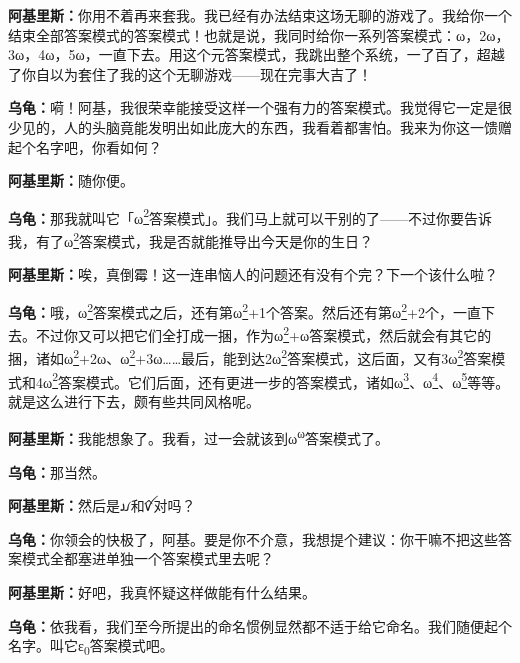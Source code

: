 \documentclass[
  12pt,
  twoside,
  openright,
  oldfontcommands,
]{memoir}
\newcommand{\dialogname}[1]{{\heifamily\bfseries #1}}
\begin{document}
\dialogname{阿基里斯：}你用不着再来套我。我已经有办法结束这场无聊的游戏了。我给你一个结束全部答案模式的答案模式！也就是说，我同时给你一系列答案模式：ω，2ω，3ω，4ω，5ω，一直下去。用这个元答案模式，我跳出整个系统，一了百了，超越了你自以为套住了我的这个无聊游戏------现在完事大吉了！

\dialogname{乌龟：}嗬！阿基，我很荣幸能接受这样一个强有力的答案模式。我觉得它一定是很少见的，人的头脑竟能发明出如此庞大的东西，我看着都害怕。我来为你这一馈赠起个名字吧，你看如何？

\dialogname{阿基里斯：}随你便。

\dialogname{乌龟：}那我就叫它「ω\hyperref[fn:Dialog15-2]{\textsuperscript{2}}答案模式」。我们马上就可以干别的了------不过你要告诉我，有了ω\hyperref[fn:Dialog15-2]{\textsuperscript{2}}答案模式，我是否就能推导出今天是你的生日？

\dialogname{阿基里斯：}唉，真倒霉！这一连串恼人的问题还有没有个完？下一个该什么啦？

\dialogname{乌龟：}哦，ω\hyperref[fn:Dialog15-2]{\textsuperscript{2}}答案模式之后，还有第ω\hyperref[fn:Dialog15-2]{\textsuperscript{2}}+1个答案。然后还有第ω\hyperref[fn:Dialog15-2]{\textsuperscript{2}}+2个，一直下去。不过你又可以把它们全打成一捆，作为ω\hyperref[fn:Dialog15-2]{\textsuperscript{2}}+ω答案模式，然后就会有其它的捆，诸如ω\hyperref[fn:Dialog15-2]{\textsuperscript{2}}+2ω、ω\hyperref[fn:Dialog15-2]{\textsuperscript{2}}+3ω\ldots\ldots 最后，能到达2ω\hyperref[fn:Dialog15-2]{\textsuperscript{2}}答案模式，这后面，又有3ω\hyperref[fn:Dialog15-2]{\textsuperscript{2}}答案模式和4ω\hyperref[fn:Dialog15-2]{\textsuperscript{2}}答案模式。它们后面，还有更进一步的答案模式，诸如ω\hyperref[fn:Dialog15-3]{\textsuperscript{3}}、ω\hyperref[fn:Dialog15-4]{\textsuperscript{4}}、ω\hyperref[fn:Dialog15-5]{\textsuperscript{5}}等等。就是这么进行下去，颇有些共同风格呢。

\dialogname{阿基里斯：}我能想象了。我看，过一会就该到ω\textsuperscript{ω}答案模式了。

\dialogname{乌龟：}那当然。

\dialogname{阿基里斯：}然后是{\gebfont ꪣ}和{\gebfont ꪤ}对吗？

\dialogname{乌龟：}你领会的快极了，阿基。要是你不介意，我想提个建议：你干嘛不把这些答案模式全都塞进单独一个答案模式里去呢？

\dialogname{阿基里斯：}好吧，我真怀疑这样做能有什么结果。

\dialogname{乌龟：}依我看，我们至今所提出的命名惯例显然都不适于给它命名。我们随便起个名字。叫它ε\textsubscript{0}答案模式吧。
\end{document}
